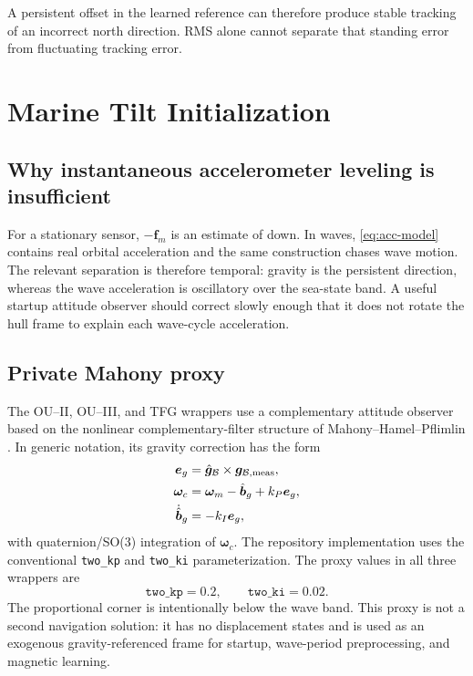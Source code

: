 \documentclass[conference]{IEEEtran}
\DeclareRobustCommand{\vct}[1]{\bm{#1}}
\begin{document}
A persistent offset in the learned reference can therefore produce stable
tracking of an incorrect north direction. RMS alone cannot separate that
standing error from fluctuating tracking error.

\section{Marine Tilt Initialization}
\label{sec:tilt}

\subsection{Why instantaneous accelerometer leveling is insufficient}

For a stationary sensor, $-\vct f_m$ is an estimate of down.  In waves,
\cref{eq:acc-model} contains real orbital acceleration and the same construction
chases wave motion.  The relevant separation is therefore temporal: gravity is the
persistent direction, whereas the wave acceleration is oscillatory over the sea-state
band.  A useful startup attitude observer should correct slowly enough that it does
not rotate the hull frame to explain each wave-cycle acceleration.

\subsection{Private Mahony proxy}

The OU--II, OU--III, and TFG wrappers use a complementary attitude
observer based on the nonlinear complementary-filter structure of
Mahony--Hamel--Pflimlin \cite{Mahony2008NonlinearComplementary}.  In generic notation,
its gravity correction has the form
\begin{align}
\vct e_g &= \hat{\vct g}_{\mathcal B}\times
            \vct g_{\mathcal B,\rm meas},\\
\vct\omega_c &= \vct\omega_m-\hat{\vct b}_g+k_P\vct e_g,\\
\dot{\hat{\vct b}}_g &= -k_I\vct e_g,
\label{eq:mahony-generic}
\end{align}
with quaternion/SO(3) integration of $\vct\omega_c$.  The repository implementation
uses the conventional \texttt{two\_kp} and \texttt{two\_ki} parameterization.  The
proxy values in all three wrappers are
\begin{equation}
\texttt{two\_kp}=0.2,
\qquad
\texttt{two\_ki}=0.02.
\label{eq:proxy-gains}
\end{equation}
The proportional corner is intentionally below the wave band.  This proxy is not a
second navigation solution: it has no displacement states and is used as an
exogenous gravity-referenced frame for startup, wave-period preprocessing, and
magnetic learning.
\end{document}
